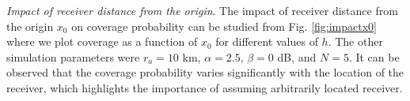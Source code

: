 \documentclass[journal,draftclsnofoot,onecolumn,12pt]{IEEEtran}
\begin{document}
{\em Impact of receiver distance from the origin}. The impact of receiver distance from the origin $x_0$ on coverage probability can be studied from Fig.  \ref{fig:impactx0} where we plot coverage as a function of $x_0$ for different values of $h$. The other simulation parameters were $r_a = 10$ km, $\alpha=2.5$, $\beta=0$ dB, and $N =5$. It can be observed that the coverage probability varies significantly with the location of the receiver, which highlights the importance of assuming arbitrarily located receiver.%
\end{document}
